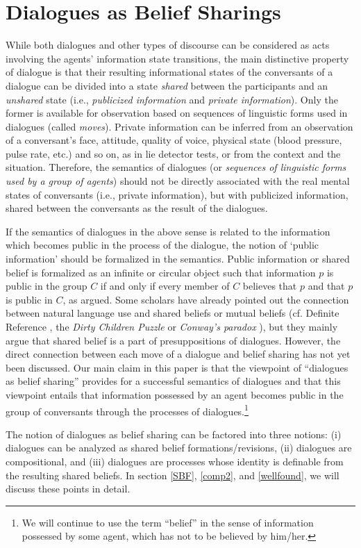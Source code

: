 \section{Dialogues as Belief Sharings}\label{view}
While both dialogues and other types of discourse can be considered as acts involving the agents' information state transitions, 
the main distinctive property of dialogue is that their resulting informational states of the conversants of a dialogue can be divided into a state {\it shared} between the participants and an {\it unshared} state (i.e., {\it publicized information} and {\it private information}).
Only the former is available for observation based on sequences of linguistic forms used in dialogues (called {\it moves}).
Private information can be inferred from an observation of a conversant's face, attitude, quality of voice, physical state (blood pressure, pulse rate, etc.) and so on, as in lie detector tests, or from the context and the situation.
Therefore, the semantics of dialogues (or {\it sequences of linguistic forms used by a group of agents}) should not be directly associated with the real mental states of conversants (i.e., private information), 
but with publicized information, shared between the conversants as the result of the dialogues.
\par
If the semantics of dialogues in the above sense is related to the information which becomes public in the process of the dialogue, 
the notion of `public information' should be formalized in the semantics.
Public information or shared belief is formalized as an infinite or circular object such that information $p$ is public in the group $C$ if and only if every member of $C$ believes that $p$ and that $p$ is public in $C$, as \cite{Lew69,CM81,Bar89} argued.
Some scholars have already pointed out the connection between natural language use and shared beliefs or mutual beliefs (cf. Definite Reference \cite{CM81}, the {\it Dirty Children Puzzle} or {\it Conway's paradox} \cite{Bar89,FHMV95}), but they mainly argue that shared belief is a part of presuppositions of dialogues.
However, the direct connection between each move of a dialogue and belief sharing has not yet been discussed.
Our main claim in this paper is that the viewpoint of ``dialogues as belief sharing'' provides for a successful semantics of dialogues and that this viewpoint entails that information possessed by an agent becomes public in the group of conversants through the processes of dialogues.\<\footnote{
We will continue to use the term ``belief'' in the sense of information possessed by some agent, which has not to be believed by him/her.}
\par
The notion of dialogues as belief sharing can be factored into three notions: (i) dialogues can be analyzed as shared belief formations/revisions, (ii) dialogues are compositional, and (iii) dialogues are processes whose identity is definable from the resulting shared beliefs.
In section \ref{SBF}, \ref{comp2}, and \ref{wellfound}, we will discuss these points in detail.
